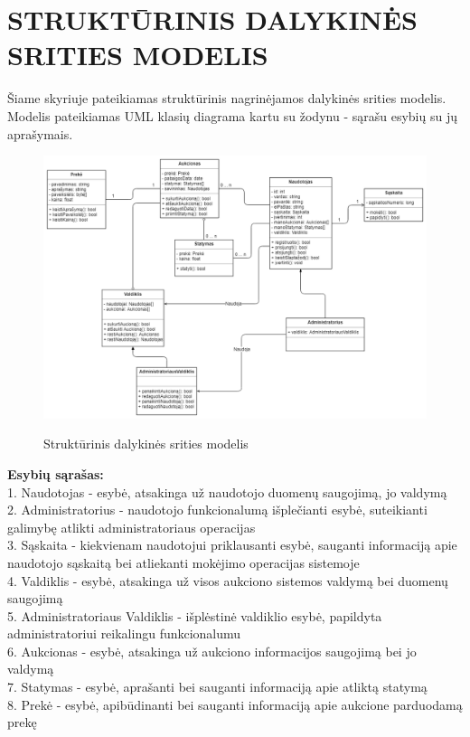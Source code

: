 \documentclass{VUMIFPSkursinis}
\begin{document}
\newpage
\section{STRUKTŪRINIS DALYKINĖS SRITIES MODELIS}
Šiame skyriuje pateikiamas struktūrinis nagrinėjamos dalykinės srities modelis. Modelis pateikiamas UML klasių diagrama kartu su žodynu - sąrašu esybių su jų aprašymais.
\begin{figure}[H]
\centering
\includegraphics[width=\linewidth]{img/umlClassDiagram.png}
\label{fig:usecase}
\caption{Struktūrinis dalykinės srities modelis}
\end{figure}
\noindent
\textbf{Esybių sąrašas:} \\
1. Naudotojas - esybė, atsakinga už naudotojo duomenų saugojimą, jo valdymą\\
2. Administratorius - naudotojo funkcionalumą išplečianti esybė, suteikianti galimybę atlikti administratoriaus operacijas\\
3. Sąskaita - kiekvienam naudotojui priklausanti esybė, sauganti informaciją apie naudotojo sąskaitą bei atliekanti mokėjimo operacijas sistemoje\\
4. Valdiklis - esybė, atsakinga už visos aukciono sistemos valdymą bei duomenų saugojimą\\
5. Administratoriaus Valdiklis - išplėstinė valdiklio esybė, papildyta administratoriui reikalingu funkcionalumu\\
6. Aukcionas - esybė, atsakinga už aukciono informacijos saugojimą bei jo valdymą\\
7. Statymas - esybė, aprašanti bei sauganti informaciją apie atliktą statymą\\
8. Prekė - esybė, apibūdinanti bei sauganti informaciją apie aukcione parduodamą prekę\\
\end{document}
